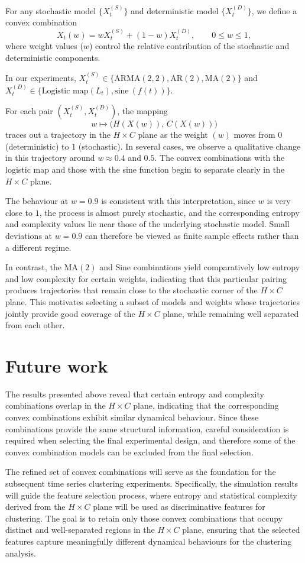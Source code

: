 \documentclass[12pt,a4paper]{article}
\begin{document}
For any stochastic model $\{X_t^{(S)}\}$ and deterministic model $\{X_t^{(D)}\}$, 
we define a convex combination
\[
X_t(w) = w X_t^{(S)} + (1-w) X_t^{(D)}, 
\qquad 0 \le w \le 1,
\]
where weight values ($w$) control the relative contribution of the stochastic and deterministic components.


In our experiments, $X_t^{(S)} \in \{\mathrm{ARMA}(2,2), \mathrm{AR}(2), \mathrm{MA}(2)\}$ 
and $X_t^{(D)} \in \{\text{Logistic map} (L_t), \text{sine}\ (f(t))\}$.

For each pair $(X_t^{(S)}, X_t^{(D)})$, the mapping
\[
w \longmapsto \bigl(H(X(w)),\, C(X(w))\bigr)
\]
traces out a trajectory in the  $H \times C$ plane as the weight $(w)$ moves from $0$ (deterministic) to $1$ (stochastic). In several cases, we observe a qualitative change in this trajectory around $w \approx 0.4$ and $0.5$. The convex combinations with the logistic map and those with the sine function begin to separate clearly in the $H \times C$ plane. 

The behaviour at $w = 0.9$ is consistent with this interpretation, since $w$ is very close to $1$, the process is almost purely stochastic, and the corresponding entropy and complexity values lie near those of the underlying stochastic model. Small deviations at $w = 0.9$ can therefore be viewed as finite sample effects rather than a different regime.

In contrast, the $\mathrm{MA}(2)$ and Sine combinations yield comparatively low entropy and low complexity for certain weights, indicating that this particular pairing produces trajectories that remain close to the stochastic corner of the $H \times C$ plane. This motivates selecting a subset of models and weights whose trajectories jointly provide good coverage of the $H \times C$ plane, while remaining well separated from each other.


\section{Future work}
The results presented above reveal that certain entropy and complexity combinations overlap in the $H \times C$ plane, indicating that the corresponding convex combinations exhibit similar dynamical behaviour. Since these combinations provide the same structural information, careful consideration is required when selecting the final experimental design, and therefore some of the convex combination models can be excluded from the final selection.

The refined set of convex combinations will serve as the foundation for the subsequent time series clustering experiments. Specifically, the simulation results will guide the feature selection process, where entropy and statistical complexity derived from the $H \times C$ plane will be used as discriminative features for clustering. The goal is to retain only those convex combinations that occupy distinct and well-separated regions in the $H \times C$ plane, ensuring that the selected features capture meaningfully different dynamical behaviours for the clustering analysis.



	
	
	
\end{document}
